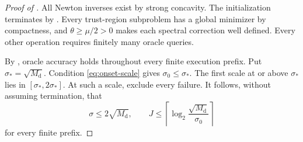 \documentclass[11pt]{article}
\numberwithin{equation}{section}
\newcommand{\Md}{M_{\mathrm d}}
\begin{document}
\begin{proof}[Proof of ]
All Newton inverses exist by strong concavity. The initialization
terminates by . Every trust-region subproblem
has a global minimizer by compactness, and $\theta\ge\mu/2>0$
makes each spectral correction well defined. Every other operation
requires finitely many oracle queries.

By , oracle accuracy holds throughout every
finite execution prefix. Put $\sigma_*=\sqrt{\Md}$.
Condition \eqref{eq:onset-scale} gives $\sigma_0\le\sigma_*$.
The first scale at or above $\sigma_*$ lies in
$[\sigma_*,2\sigma_*]$. At such a scale,
 exclude every failure.
It follows, without assuming termination, that
\begin{equation}\label{eq:scale-bound}
 \sigma\le2\sqrt{\Md},\qquad
 J\le\left\lceil\log_2\frac{\sqrt{\Md}}{\sigma_0}\right\rceil
\end{equation}
for every finite prefix.


\end{proof}
\end{document}
